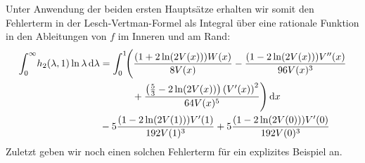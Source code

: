 Unter Anwendung der beiden ersten Hauptsätze erhalten wir somit den Fehlerterm
in der Lesch-Vertman-Formel als Integral über eine rationale Funktion in den
Ableitungen von $f$ im Inneren und am Rand:
\begin{align*}
  \Integ[\infty]{0}{\lambda}{
    h_2(\lambda, 1) \ln\lambda
  }
  &=
  \Int{x}{\Biggl(\frac{(1 + 2 \ln(2 V(x))) W(x)}{8 V(x)}
    - \frac{ (1 - 2 \ln(2 V(x)))V''(x)}{96 V(x)^{3}} \\
    &\hphantom{=\int_0^1\Biggl(}\mathbin{+} \frac{\left(\frac{5}{3} - 2\ln(2
    V(x))\right)\left(V'(x)\right)^{2}}{64 V(x)^{5}}\Biggr) } \\
&\mathbin- 5\frac{(1 - 2\ln(2 V(1)))V'(1)}{192 V(1)^3}
+ 5\frac{(1 - 2 \ln(2 V(0)))V'(0)}{192 V(0)^3}
\end{align*}
Zuletzt geben wir noch einen solchen Fehlerterm für ein explizites Beispiel an.
